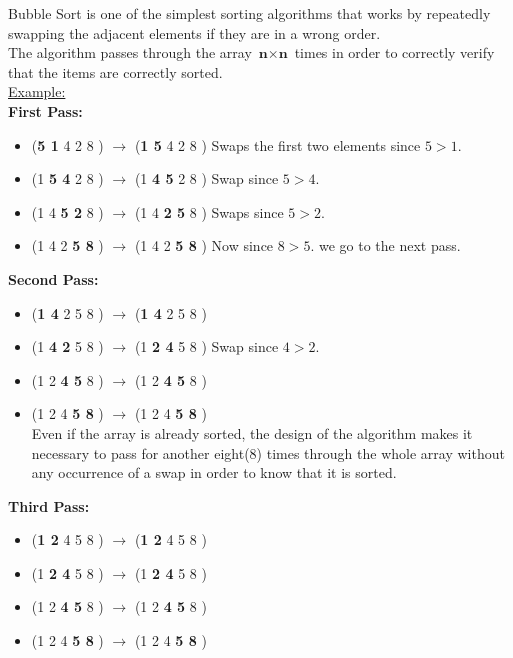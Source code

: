 \documentclass{article}
\begin{document}
Bubble Sort is one of the simplest sorting algorithms that works by repeatedly swapping the adjacent elements if they are in a wrong order.\\
The algorithm passes through the array $\textbf{n} \times \textbf{n}$ times in order to correctly verify that the items are correctly sorted.\hfill \break \\

\noindent\underline{Example:}\hfill \break \\

\noindent\textbf{First Pass:}
\begin{itemize}
\setlength{\itemindent}{.2in}
    \item (\textbf{5 1} 4 2 8 ) $\rightarrow$ (\textbf{1 5} 4 2 8 ) Swaps the first two elements since $ 5 > 1. $
    \item (1 \textbf{5 4} 2 8 ) $\rightarrow$ (1 \textbf{4 5} 2 8 ) Swap since $ 5 > 4. $
    \item (1 4 \textbf{5 2} 8 ) $\rightarrow$ (1 4 \textbf{2 5} 8 ) Swaps since $ 5 > 2. $
    \item (1 4 2 \textbf{5 8} ) $\rightarrow$ (1 4 2 \textbf{5 8} ) Now since $ 8 > 5. $ we go to the next pass.\hfill \break 
\end{itemize}
\noindent\textbf{Second Pass:}
\begin{itemize}
\setlength{\itemindent}{.2in}
    \item (\textbf{1 4} 2 5 8 ) $\rightarrow$ (\textbf{1 4} 2 5 8 ) 
    \item (1 \textbf{4 2} 5 8 ) $\rightarrow$ (1 \textbf{2 4} 5 8 ) Swap since $ 4 > 2. $
    \item (1 2 \textbf{4 5} 8 ) $\rightarrow$ (1 2 \textbf{4 5} 8 ) 
    \item (1 2 4 \textbf{5 8} ) $\rightarrow$ (1 2 4 \textbf{5 8} )\hfill \break \\
    Even if the array is already sorted, the design of the algorithm makes it necessary to
    pass for another eight(8) times through the whole array without any occurrence of a swap in order
    to know that it is sorted.\hfill \break 
\end{itemize}
\noindent\textbf{Third Pass:}
\begin{itemize}
\setlength{\itemindent}{.2in}
    \item (\textbf{1 2} 4 5 8 ) $\rightarrow$ (\textbf{1 2} 4 5 8 ) 
    \item (1 \textbf{2 4} 5 8 ) $\rightarrow$ (1 \textbf{2 4} 5 8 ) 
    \item (1 2 \textbf{4 5} 8 ) $\rightarrow$ (1 2 \textbf{4 5} 8 ) 
    \item (1 2 4 \textbf{5 8} ) $\rightarrow$ (1 2 4 \textbf{5 8} )     
\end{itemize}
\end{document}
